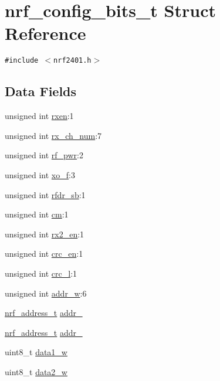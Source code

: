 \hypertarget{structnrf__config__bits__t}{
\section{nrf\_\-config\_\-bits\_\-t Struct Reference}
\label{structnrf__config__bits__t}
}
{\tt \#include $<$nrf2401.h$>$}

\subsection*{Data Fields}
\begin{CompactItemize}
\item 
unsigned int \hyperlink{structnrf__config__bits__t_854c05fe9c8d602df4fbcb8f53669aca}{rxen}:1
\item 
unsigned int \hyperlink{structnrf__config__bits__t_06ccf2e47df1431ffcad0c87946f59a7}{rx\_\-ch\_\-num}:7
\item 
unsigned int \hyperlink{structnrf__config__bits__t_931af1233b52d2de3210af9a693d774a}{rf\_\-pwr}:2
\item 
unsigned int \hyperlink{structnrf__config__bits__t_6ab1a0df70813a03e2a8da882de23437}{xo\_\-f}:3
\item 
unsigned int \hyperlink{structnrf__config__bits__t_69ed8edc0fd106984843c43b6c12ffa9}{rfdr\_\-sb}:1
\item 
unsigned int \hyperlink{structnrf__config__bits__t_fad6dd3d6d8234e9ff1227d715ff2f6c}{cm}:1
\item 
unsigned int \hyperlink{structnrf__config__bits__t_3852d77b88b86fd1acd154baecb9a6c2}{rx2\_\-en}:1
\item 
unsigned int \hyperlink{structnrf__config__bits__t_e871d44380a8993366cb72bbada57f86}{crc\_\-en}:1
\item 
unsigned int \hyperlink{structnrf__config__bits__t_c92bc2e054e12c9d6280b98bc329e2cf}{crc\_\-l}:1
\item 
unsigned int \hyperlink{structnrf__config__bits__t_502ae4e72d50d451dfeb3ea676bad844}{addr\_\-w}:6
\item 
\hyperlink{structnrf__address__t}{nrf\_\-address\_\-t} \hyperlink{structnrf__config__bits__t_6d67ab223708c6ddd9e98123a185c5de}{addr\_}
\item 
\hyperlink{structnrf__address__t}{nrf\_\-address\_\-t} \hyperlink{structnrf__config__bits__t_97d736891f34778ce763c7c59c8fd772}{addr\_}
\item 
uint8\_\-t \hyperlink{structnrf__config__bits__t_a0d3c8404b172ff4fe0c93576cbb24b6}{data1\_\-w}
\item 
uint8\_\-t \hyperlink{structnrf__config__bits__t_0c1bd7d7e3cac550eb25a2d5f3b76bcd}{data2\_\-w}
\end{CompactItemize}



